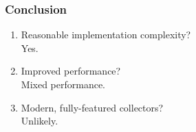 \begin{frame}
    \frametitle{Conclusion}
    \begin{enumerate}
        \item Reasonable implementation complexity? \\
          Yes.
        \item Improved performance? \\
          Mixed performance.
        \item Modern, fully-featured collectors? \\
          Unlikely.
    \end{enumerate}
\end{frame}
